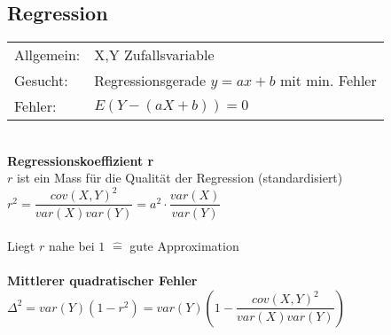 \begin{minipage}[t]{9cm}
  \subsection{Regression}
  \begin{tabular}{ll}
    Allgemein: & X,Y Zufallsvariable \\
    Gesucht: & Regressionsgerade $y=ax+b$ mit min. Fehler \\
    Fehler: & $E(Y-(aX+b))=0$ \\
  \end{tabular} \\
 
  \textbf{Regressionskoeffizient r} \\
  $r$ ist ein Mass für die Qualität der Regression (standardisiert) \\
  $r^2=\dfrac{cov(X,Y)^2}{var(X)var(Y)}=a^2\cdot\dfrac{var(X)}{var(Y)}$ \\  \\
  Liegt $r$ nahe bei $1$ $\widehat{=}$ gute Approximation\\ \\
 
  \textbf{Mittlerer quadratischer Fehler} \\
  $\Delta^2 = var(Y)(1-r^2) =
  var(Y)\left(1-\dfrac{cov(X,Y)^2}{var(X)var(Y)}\right) $ \\
\end{minipage}
